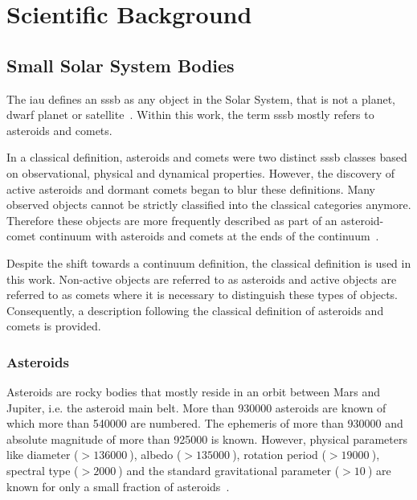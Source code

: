 \section{Scientific Background} \label{sec:theory}
%
%
%
%

\subsection{Small Solar System Bodies}
The \gls{iau} defines an \gls{sssb} as any object in the Solar System, that is not a planet, dwarf planet or satellite~\cite{iau_sssb}. Within this work, the term \gls{sssb} mostly refers to asteroids and comets.

In a classical definition, asteroids and comets were two distinct \gls{sssb} classes based on observational, physical and dynamical properties. However, the discovery of active asteroids and dormant comets began to blur these definitions. Many observed objects cannot be strictly classified into the classical categories anymore. Therefore these objects are more frequently described as part of an asteroid-comet continuum with asteroids and comets at the ends of the continuum~\cite{Hsieh2017Asteroid-cometSystem}.

Despite the shift towards a continuum definition, the classical definition is used in this work. Non-active objects are referred to as asteroids and active objects are referred to as comets where it is necessary to distinguish these types of objects. Consequently, a description following the classical definition of asteroids and comets is provided.

\subsubsection{Asteroids}
Asteroids are rocky bodies that mostly reside in an orbit between Mars and Jupiter, i.e. the asteroid main belt. More than \SI{930000}{} asteroids are known of which more than \SI{540000}{} are numbered. The ephemeris of more than \SI{930000}{} and absolute magnitude of more than \SI{925000}{} is known. However, physical parameters like diameter ($> \SI{136000}{}$), albedo ($> \SI{135000}{}$), rotation period ($> \SI{19000}{}$), spectral type ($> \SI{2000}{}$) and the standard gravitational parameter ($> \SI{10}{}$) are known for only a small fraction of asteroids~\cite{JPLEngine}.

